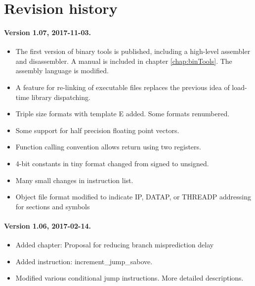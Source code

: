 \documentclass[forwardcom.tex]{subfiles}
\begin{document}
\RaggedRight

\chapter{Revision history}

\subsubsection{Version 1.07, 2017-11-03.}
\begin{itemize}
\item The first version of binary tools is published, including a high-level assembler and disassembler. A manual is included in chapter \ref{chap:binTools}. The assembly language is modified.
\item A feature for re-linking of executable files replaces the previous idea of load-time library dispatching.
\item Triple size formats with template E added. Some formats renumbered.
\item Some support for half precision floating point vectors.
\item Function calling convention allows return using two registers.
\item 4-bit constants in tiny format changed from signed to unsigned.
\item Many small changes in instruction list.
\item Object file format modified to indicate IP, DATAP, or THREADP addressing for sections and symbols
\end{itemize}


\subsubsection{Version 1.06, 2017-02-14.}
\begin{itemize}
\item Added chapter: Proposal for reducing branch misprediction delay
\item Added instruction: increment\_jump\_sabove.
\item Modified various conditional jump instructions. More detailed descriptions.
\end{itemize}
\end{document}
